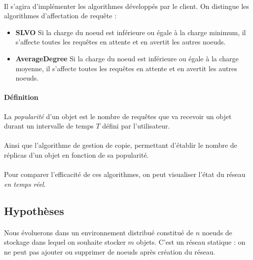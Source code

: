 \documentclass[12pt]{article}
\begin{document}
\paragraph{}Il s'agira d'implémenter les algorithmes développés par le client.
On distingue les algorithmes d'affectation de requête :

\begin{itemize}
 \item \textbf{SLVO} 
    Si la charge du noeud est inférieure ou égale à la charge minimum, il s'affecte toutes les requêtes en attente et en avertit les autres noeuds.
 \item \textbf{AverageDegree}
    Si la charge du noeud est inférieure ou égale à la charge moyenne, il s'affecte toutes les requêtes en attente et en avertit les autres noeuds.
\end{itemize}

\paragraph{Définition} La \textit{popularité} d'un objet est le nombre de requêtes que va recevoir un objet durant un intervalle de temps $T$ défini par l'utilisateur.

\paragraph{}Ainsi que l'algorithme de gestion de copie, permettant d'établir le nombre de réplicas d'un objet en fonction de sa popularité.

\paragraph{} Pour comparer l'efficacité de ces algorithmes, on peut visualiser l'état du réseau \textit{en temps réel}.


\subsection{Hypothèses}

\paragraph{} Nous évoluerons dans un environnement distribué constitué de $n$ noeuds de stockage dans lequel on souhaite stocker $m$ objets. C'est un réseau statique : on ne peut pas ajouter ou supprimer de noeuds après création du réseau.
\end{document}
